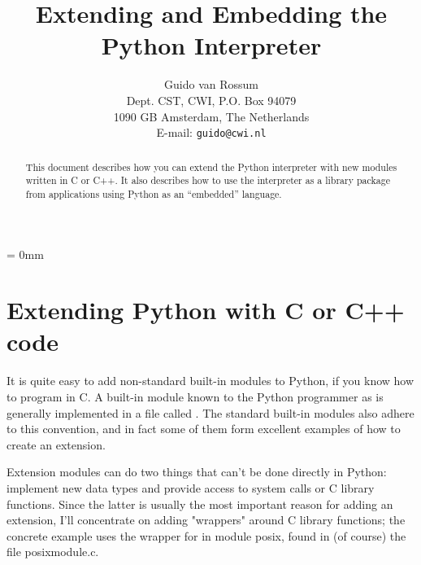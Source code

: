 
\title{\bf Extending and Embedding the Python Interpreter}

\author{
	Guido van Rossum \\
	Dept. CST, CWI, P.O. Box 94079 \\
	1090 GB Amsterdam, The Netherlands \\
	E-mail: {\tt guido@cwi.nl}
}

\makeindex




\maketitle

\begin{abstract}

\noindent
This document describes how you can extend the Python interpreter with
new modules written in C or C++.  It also describes how to use the
interpreter as a library package from applications using Python as an
``embedded'' language.

\end{abstract}

\pagebreak

{
\parskip = 0mm
\tableofcontents
}

\pagebreak



\chapter{Extending Python with C or C++ code}

It is quite easy to add non-standard built-in modules to Python, if
you know how to program in C.  A built-in module known to the Python
programmer as  is generally implemented in a file called
.  The standard built-in modules also adhere to this
convention, and in fact some of them form excellent examples of how to
create an extension.

Extension modules can do two things that can't be done directly in
Python: implement new data types and provide access to system calls or
C library functions.  Since the latter is usually the most important
reason for adding an extension, I'll concentrate on adding "wrappers"
around C library functions; the concrete example uses the wrapper for
 in module posix, found in (of course) the file
posixmodule.c.

